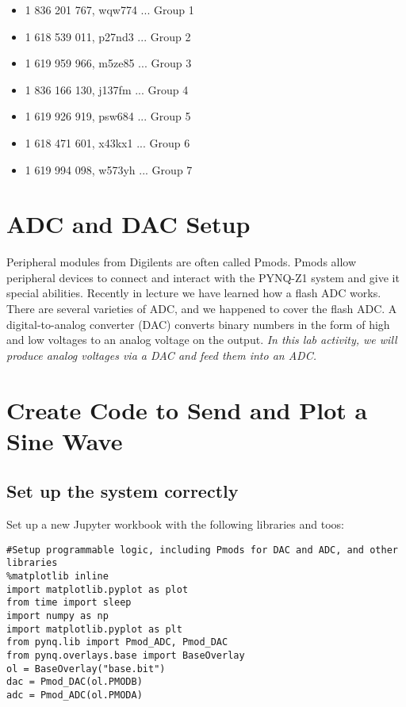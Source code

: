 \documentclass{article}
\begin{document}
\begin{itemize}
\item 1 836 201 767, wqw774 ... Group 1
\item 1 618 539 011, p27nd3 ... Group 2
\item 1 619 959 966, m5ze85 ... Group 3
\item 1 836 166 130, j137fm ... Group 4
\item 1 619 926 919, psw684 ... Group 5
\item 1 618 471 601, x43kx1 ... Group 6
\item 1 619 994 098, w573yh ... Group 7
\end{itemize}

\section{ADC and DAC Setup}

Peripheral modules from Digilents are often called Pmods.  Pmods allow peripheral devices to connect and interact with the PYNQ-Z1 system and give it special abilities.  Recently in lecture we have learned how a flash ADC works.  There are several varieties of ADC, and we happened to cover the flash ADC.  A digital-to-analog converter (DAC) converts binary numbers in the form of high and low voltages to an analog voltage on the output.  \textit{In this lab activity, we will produce analog voltages via a DAC and feed them into an ADC.}

\section{Create Code to Send and Plot a Sine Wave}

\subsection{Set up the system correctly}

Set up a new Jupyter workbook with the following libraries and toos:

\begin{verbatim}
#Setup programmable logic, including Pmods for DAC and ADC, and other libraries
%matplotlib inline
import matplotlib.pyplot as plot
from time import sleep
import numpy as np
import matplotlib.pyplot as plt
from pynq.lib import Pmod_ADC, Pmod_DAC
from pynq.overlays.base import BaseOverlay
ol = BaseOverlay("base.bit")
dac = Pmod_DAC(ol.PMODB)
adc = Pmod_ADC(ol.PMODA)
\end{verbatim}
\end{document}
